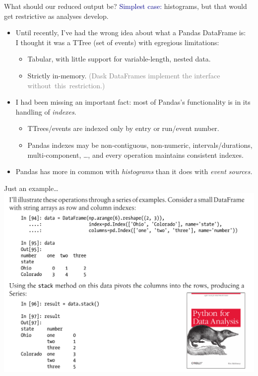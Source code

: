 \documentclass[aspectratio=169]{beamer}
\begin{document}
\begin{frame}{What should our reduced output be?}
\vspace{0.5 cm}
\textcolor{darkblue}{Simplest case:} histograms, but that would get restrictive as analyses develop.

\vspace{0.25 cm}

\vspace{0.15 cm}
\begin{itemize}\setlength{\itemsep}{0.35 cm}
\item<3-> Until recently, I've had the wrong idea about what a Pandas DataFrame is: \\ I thought it was a TTree (set of events) with egregious limitations:
\vspace{0.1 cm}
\begin{itemize}\setlength{\itemsep}{0.1 cm}
\item Tabular, with little support for variable-length, nested data.
\item Strictly in-memory. \textcolor{gray}{(Dask DataFrames implement the interface \mbox{without this restriction.)\hspace{-1 cm}}}
\end{itemize}
\item<4-> I had been missing an important fact: most of Pandas's functionality is in its handling of {\it indexes}.
\vspace{0.1 cm}
\begin{itemize}\setlength{\itemsep}{0.1 cm}
\item TTrees/events are indexed only by entry or run/event number.
\item Pandas indexes may be non-contiguous, non-numeric, intervals/durations, multi-component, \ldots, and every operation maintains consistent indexes.
\end{itemize}
\item<5-> Pandas has more in common with {\it histograms} than it does with {\it event sources.}
\end{itemize}
\end{frame}

\begin{frame}{Just an example\ldots}
\vspace{0.25 cm}
\mbox{ } \hfill \includegraphics[width=0.78\linewidth]{pandas-book.png} \hfill \mbox{ }
\end{frame}
\end{document}
